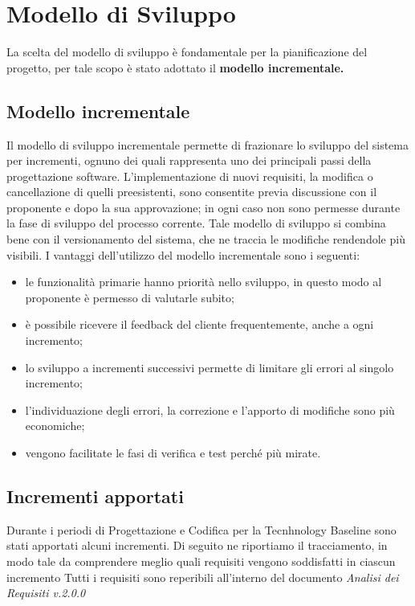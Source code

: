 \section{Modello di Sviluppo}
La scelta del modello di sviluppo è fondamentale per la pianificazione del progetto, per tale scopo è stato adottato il \textbf{modello incrementale.}

\subsection{Modello incrementale}
Il modello di sviluppo incrementale permette di frazionare lo sviluppo del sistema per incrementi, ognuno dei quali rappresenta uno dei principali passi della progettazione software.
L'implementazione di nuovi requisiti, la modifica o cancellazione di quelli preesistenti, sono consentite previa discussione con il proponente e dopo la sua approvazione; in ogni caso non sono permesse durante la fase di sviluppo del processo corrente.
Tale modello di sviluppo si combina bene con il versionamento del sistema, che ne traccia le modifiche rendendole più visibili.
I vantaggi dell'utilizzo del modello incrementale sono i seguenti:
\begin{itemize}
    \item le funzionalità primarie hanno priorità nello sviluppo, in questo modo al proponente è permesso di valutarle subito;
    \item è possibile ricevere il feedback del cliente frequentemente, anche a ogni incremento;
    \item lo sviluppo a incrementi successivi permette di limitare gli errori al singolo incremento;
    \item l'individuazione degli errori, la correzione e l'apporto di modifiche sono più economiche;
    \item vengono facilitate le fasi di verifica e test perché più mirate.
\end{itemize}

\subsection{Incrementi apportati}
Durante i periodi di Progettazione e Codifica per la Tecnhnology Baseline sono stati apportati alcuni incrementi. Di seguito ne riportiamo il tracciamento, in modo tale da comprendere meglio quali requisiti vengono soddisfatti in ciascun incremento 
\newline 
Tutti i requisiti sono reperibili all'interno del documento \textit{Analisi dei Requisiti v.2.0.0}

